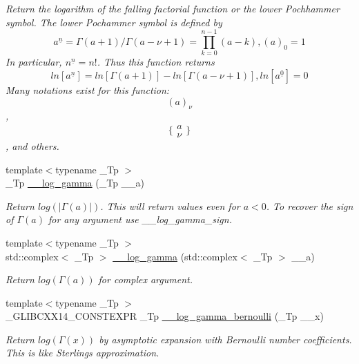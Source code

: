\begin{DoxyCompactItemize}
\begin{DoxyCompactList}\small\item\em Return the logarithm of the falling factorial function or the lower Pochhammer symbol. The lower Pochammer symbol is defined by \[ a^{\underline{n}} = \Gamma(a + 1) / \Gamma(a - \nu + 1) = \prod_{k=0}^{n-1} (a - k), (a)_0 = 1 \] In particular, $ n^{\underline{n}} = n! $. Thus this function returns \[ ln[a^{\underline{n}}] = ln[\Gamma(a + 1)] - ln[\Gamma(a - \nu + 1)], ln[a^{\underline{0}}] = 0 \] Many notations exist for this function\+: \[ (a)_\nu \], \[ \{ \begin{array}{c} a \\ \nu \end{array} \} \], and others. \end{DoxyCompactList}\item 
{\footnotesize template$<$typename \+\_\+\+Tp $>$ }\\\+\_\+\+Tp \hyperlink{namespacestd_1_1____detail_af6c4c0192a07f467fd9ddeebb28a34d4}{\+\_\+\+\_\+log\+\_\+gamma} (\+\_\+\+Tp \+\_\+\+\_\+a)
\begin{DoxyCompactList}\small\item\em Return $ log(|\Gamma(a)|) $. This will return values even for $ a < 0 $. To recover the sign of $ \Gamma(a) $ for any argument use {\itshape \+\_\+\+\_\+log\+\_\+gamma\+\_\+sign}. \end{DoxyCompactList}\item 
{\footnotesize template$<$typename \+\_\+\+Tp $>$ }\\std\+::complex$<$ \+\_\+\+Tp $>$ \hyperlink{namespacestd_1_1____detail_ad37ad67a4b856eb97b13c8844f9ef8d8}{\+\_\+\+\_\+log\+\_\+gamma} (std\+::complex$<$ \+\_\+\+Tp $>$ \+\_\+\+\_\+a)
\begin{DoxyCompactList}\small\item\em Return $ log(\Gamma(a)) $ for complex argument. \end{DoxyCompactList}\item 
{\footnotesize template$<$typename \+\_\+\+Tp $>$ }\\\+\_\+\+G\+L\+I\+B\+C\+X\+X14\+\_\+\+C\+O\+N\+S\+T\+E\+X\+PR \+\_\+\+Tp \hyperlink{namespacestd_1_1____detail_ac13e31ebcd3c99d6a7cad9010e039315}{\+\_\+\+\_\+log\+\_\+gamma\+\_\+bernoulli} (\+\_\+\+Tp \+\_\+\+\_\+x)
\begin{DoxyCompactList}\small\item\em Return $log(\Gamma(x))$ by asymptotic expansion with Bernoulli number coefficients. This is like Sterling\textquotesingle{}s approximation. \end{DoxyCompactList}\item 

\end{DoxyCompactItemize}
